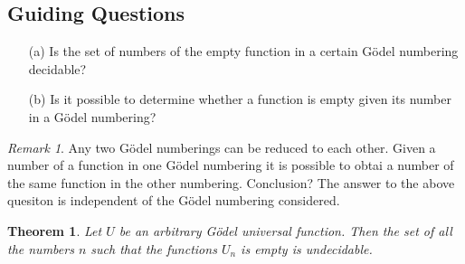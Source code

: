 \documentclass[10pt, letterpaper]{article}
\newtheorem{thm}{Theorem}
\theoremstyle{remark}
\newtheorem{rem}{Remark}
\theoremstyle{definition}
\begin{document}
\subsection*{Guiding Questions}

\begin{enumerate}
    \item[(a)] Is the set of numbers of the empty function in a certain G\"{o}del numbering decidable?
    \item[(b)] Is it possible to determine whether a function is empty given its number in a G\"{o}del numbering? 
\end{enumerate}

\begin{rem}
    Any two G\"{o}del numberings can be reduced to each other. Given a number of a function in one G\"{o}del numbering it is possible 
    to obtai a number of the same function in the other numbering. Conclusion? The answer to the above quesiton is independent 
    of the G\"{o}del numbering considered.
\end{rem}

\begin{thm}
    Let $U$ be an arbitrary G\"{o}del universal function. Then the set of all the numbers $n$ such that the functions $U_n$ is 
    empty is undecidable. 
\end{thm}
\end{document}
